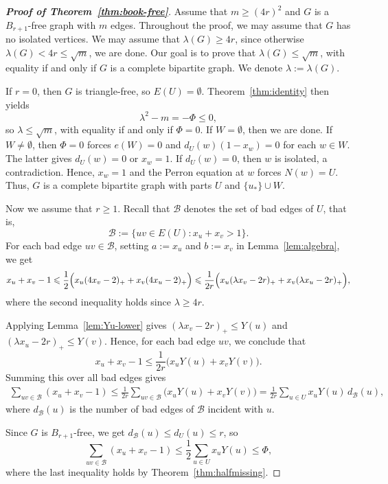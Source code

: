 \documentclass[11pt,a4paper]{article}
\theoremstyle{definition}
\theoremstyle{plain}
\renewcommand{\le}{\leqslant}
\renewcommand{\ge}{\geqslant}
\begin{document}
\begin{proof}[{\bf Proof of Theorem~\ref{thm:book-free}}]
Assume that $m\ge (4r)^2$ and $G$ is a $B_{r+1}$-free graph with $m$ edges. Throughout the proof, we may assume that $G$ has no isolated vertices. 
We may assume that $\lambda (G)\ge 4r$, since otherwise $\lambda(G)< 4r\le \sqrt{m}$, we are done. 
Our goal is to prove that $\lambda(G)\le \sqrt{m}$, with equality if and only if $G$ is a complete bipartite graph. We denote $\lambda :=\lambda (G)$. 

If $r=0$, then $G$ is triangle-free, so $E(U)=\emptyset$. 
Theorem~\ref{thm:identity} then yields 
\[ \lambda^2-m=-\Phi\le 0, \] 
so $\lambda \le \sqrt{m}$, with equality if and only if $\Phi =0$. 
If $W=\emptyset$, then we are done. 
If $W\neq \emptyset$, then $\Phi =0$ forces $e(W)=0$ and $d_U(w)(1-x_w)=0$ for each $w\in W$. The latter gives $d_U(w)=0$ or $x_w=1$.
If $d_U(w)=0$, then $w$ is isolated, a contradiction. 
Hence, $x_w=1$ and the Perron equation at $w$ forces $N(w)=U$.  
Thus, $G$ is a complete bipartite graph with parts $U$ and $\{u_*\}\cup W$.  

Now we assume that $r\ge 1$. 
Recall that $\mathcal{B}$ denotes the set of bad edges of $U$, that is,
\[
\mathcal{B}:=\{uv\in E(U):x_u+x_v>1\}.
\]
For each bad edge $uv\in\mathcal{B}$, setting $a:=x_u$ and $b:=x_v$ in Lemma~\ref{lem:algebra}, we get 
\begin{equation} \label{eq-after-4-4}
x_u + x_v-1 
\le
\frac12\Bigl(x_u(4x_v-2)_+ + x_v(4x_u-2)_+\Bigr) 
\le \frac{1}{2r} \Big( x_u(\lambda x_v-2r)_+ + x_v(\lambda x_u-2r)_+\Big),
\end{equation}
where the second inequality holds since $\lambda \ge 4r$. 


Applying Lemma~\ref{lem:Yu-lower} gives 
$(\lambda x_v-2r)_+\le Y(u)$ and $(\lambda x_u -2r)_+\le Y(v)$. 
Hence, for each bad edge $uv$, we conclude that 
\[
x_u+x_v-1\le \frac{1}{2r}\Big( x_uY(u)+x_vY(v) \Big).
\]
Summing this over all bad edges gives
\begin{align*}
\sum_{uv\in \mathcal{B}}(x_u+x_v-1)
\le \frac1{2r}\sum_{uv\in \mathcal{B}}\bigl(x_uY(u)+x_vY(v)\bigr) 
=\frac1{2r}\sum_{u\in U}x_uY(u)\,d_{\mathcal{B}}(u),
\end{align*}
where $d_{\mathcal{B}}(u)$ is the number of bad edges of $\mathcal{B}$ incident with $u$. 

Since $G$ is $B_{r+1}$-free, we get $d_{\mathcal{B}}(u)\le d_U(u)\le r$, so 
\[
\sum_{uv\in \mathcal{B}}(x_u+x_v-1)
\le
\frac12\sum_{u\in U}x_uY(u) \le \Phi,
\]
where the last inequality holds by  Theorem~\ref{thm:halfmissing}. 



\end{proof}
\end{document}
